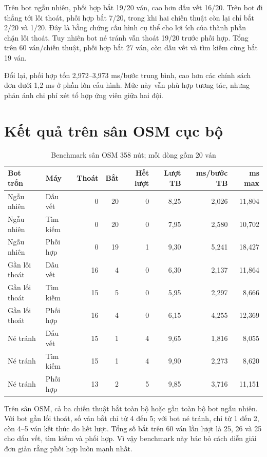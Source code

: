Trên bot ngẫu nhiên, phối hợp bắt 19/20 ván, cao hơn dấu vết 16/20. Trên bot đi
thẳng tới lối thoát, phối hợp bắt 7/20, trong khi hai chiến thuật còn lại chỉ bắt
2/20 và 1/20. Đây là bằng chứng cấu hình cụ thể cho lợi ích của thành phần chặn
lối thoát. Tuy nhiên bot né tránh vẫn thoát 19/20 trước phối hợp. Tổng trên 60
ván/chiến thuật, phối hợp bắt 27 ván, còn dấu vết và tìm kiếm cùng bắt 19 ván.

Đổi lại, phối hợp tốn 2,972--3,973 ms/bước trung bình, cao hơn các chính sách đơn
dưới 1,2 ms ở phần lớn cấu hình. Mức này vẫn phù hợp tương tác, nhưng phản ánh chi
phí xét tổ hợp ứng viên giữa hai đội.

\section{Kết quả trên sân OSM cục bộ}

\begin{table}[H]
\centering
\small
\caption{Benchmark sân OSM 358 nút; mỗi dòng gồm 20 ván}
\begin{tabular}{llrrrrrr}
\toprule
\textbf{Bot trốn} & \textbf{Máy} & \textbf{Thoát} & \textbf{Bắt} & \textbf{Hết lượt} &
\textbf{Lượt TB} & \textbf{ms/bước TB} & \textbf{ms max} \\
\midrule
Ngẫu nhiên & Dấu vết & 0 & 20 & 0 & 8,25 & 2,026 & 11,804 \\
Ngẫu nhiên & Tìm kiếm & 0 & 20 & 0 & 7,95 & 2,580 & 10,702 \\
Ngẫu nhiên & Phối hợp & 0 & 19 & 1 & 9,30 & 5,241 & 18,427 \\
Gần lối thoát & Dấu vết & 16 & 4 & 0 & 6,30 & 2,137 & 11,864 \\
Gần lối thoát & Tìm kiếm & 15 & 5 & 0 & 5,95 & 2,297 & 8,666 \\
Gần lối thoát & Phối hợp & 16 & 4 & 0 & 6,15 & 4,255 & 12,369 \\
Né tránh & Dấu vết & 15 & 1 & 4 & 9,65 & 1,816 & 8,055 \\
Né tránh & Tìm kiếm & 15 & 1 & 4 & 9,90 & 2,273 & 8,620 \\
Né tránh & Phối hợp & 13 & 2 & 5 & 9,85 & 3,716 & 11,151 \\
\bottomrule
\end{tabular}
\end{table}

Trên sân OSM, cả ba chiến thuật bắt toàn bộ hoặc gần toàn bộ bot ngẫu nhiên.
Với bot gần lối thoát, số ván bắt chỉ từ 4 đến 5; với bot né tránh, chỉ từ 1 đến
2, còn 4--5 ván kết thúc do hết lượt. Tổng số bắt trên 60 ván lần lượt là 25,
26 và 25 cho dấu vết, tìm kiếm và phối hợp. Vì vậy benchmark này bác bỏ cách diễn
giải đơn giản rằng phối hợp luôn mạnh nhất.

